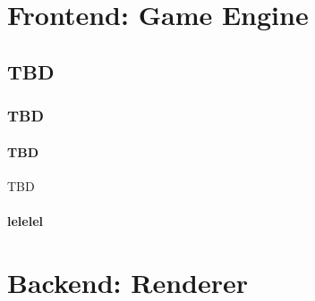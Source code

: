 
\section{Frontend: Game Engine}

\subsection{TBD}

\subsubsection{TBD}
 
\paragraph{TBD} TBD
\paragraph{lelelel}

\section{Backend: Renderer}